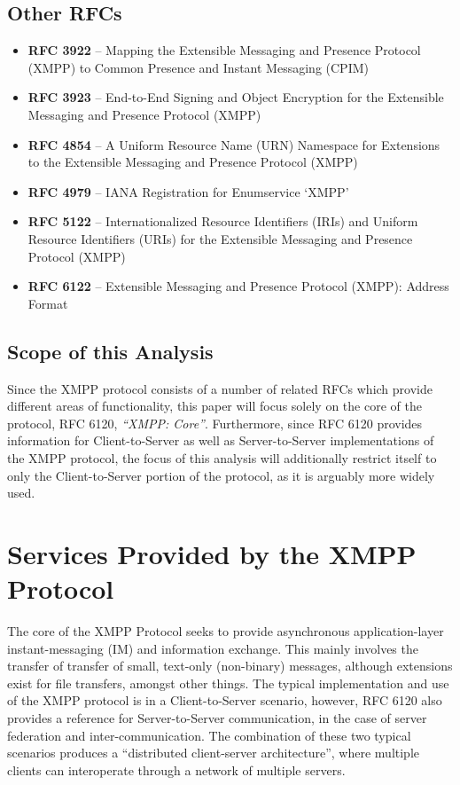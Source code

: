 \documentclass{article}
\begin{document}
\subsection{Other RFCs}
\begin{itemize}
    \item \textbf{RFC 3922} -- Mapping the Extensible Messaging and Presence
        Protocol (XMPP) to Common Presence and Instant Messaging (CPIM)
    \item \textbf{RFC 3923} -- End-to-End Signing and Object Encryption for the
        Extensible Messaging and Presence Protocol (XMPP)
    \item \textbf{RFC 4854} -- A Uniform Resource Name (URN) Namespace for
        Extensions to the Extensible Messaging and Presence Protocol (XMPP)
    \item \textbf{RFC 4979} -- IANA Registration for Enumservice `XMPP'
    \item \textbf{RFC 5122} -- Internationalized Resource Identifiers (IRIs) and
        Uniform Resource Identifiers (URIs) for the Extensible Messaging and
        Presence Protocol (XMPP)
    \item \textbf{RFC 6122} -- Extensible Messaging and Presence Protocol
        (XMPP): Address Format
\end{itemize}

\subsection{Scope of this Analysis}
Since the XMPP protocol consists of a number of related RFCs which provide
different areas of functionality, this paper will focus solely on the core of
the protocol, RFC 6120, \emph{``XMPP: Core''}. Furthermore, since RFC 6120
provides information for Client-to-Server as well as Server-to-Server
implementations of the XMPP protocol, the focus of this analysis will
additionally restrict itself to only the Client-to-Server portion of the
protocol, as it is arguably more widely used.

\section{Services Provided by the XMPP Protocol}
The core of the XMPP Protocol seeks to provide asynchronous application-layer
instant-messaging (IM) and information exchange. This mainly involves the
transfer of transfer of small, text-only (non-binary) messages, although
extensions exist for file transfers, amongst other things. The typical
implementation and use of the XMPP protocol is in a Client-to-Server scenario,
however, RFC 6120 also provides a reference for Server-to-Server communication,
in the case of server federation and inter-communication. The combination of
these two typical scenarios produces a ``distributed client-server
architecture'', where multiple clients can interoperate through a network of
multiple servers.
\end{document}
